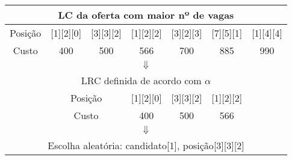\begin{table}[h!]
\centering
\begin{tabular}{ccccccc}
\multicolumn{7}{c}{LC da oferta com maior nº de vagas} \\ \hline
\multicolumn{1}{|c|}{Posição} & \multicolumn{1}{c|}{{[}1{]}{[}2{]}{[}0{]}} & \multicolumn{1}{c|}{{[}3{]}{[}3{]}{[}2{]}} & \multicolumn{1}{c|}{{[}1{]}{[}2{]}{[}2{]}} & \multicolumn{1}{c|}{{[}3{]}{[}2{]}{[}3{]}} & \multicolumn{1}{c|}{{[}7{]}{[}5{]}{[}1{]}} & \multicolumn{1}{c|}{{[}1{]}{[}4{]}{[}4{]}} \\ \hline
\multicolumn{1}{|c|}{Custo} & \multicolumn{1}{c|}{400} & \multicolumn{1}{c|}{500} & \multicolumn{1}{c|}{566} & \multicolumn{1}{c|}{700} & \multicolumn{1}{c|}{885} & \multicolumn{1}{c|}{990} \\ \hline
\multicolumn{7}{c}{\Huge\(\Downarrow\) \vspace{2mm}} \\
\multicolumn{7}{c}{LRC definida de acordo com \(\alpha\)} \\ \cline{2-6}
\multicolumn{1}{c|}{} & \multicolumn{2}{c|}{Posição} & \multicolumn{1}{c|}{{[}1{]}{[}2{]}{[}0{]}} & \multicolumn{1}{c|}{{[}3{]}{[}3{]}{[}2{]}} & \multicolumn{1}{c|}{{[}1{]}{[}2{]}{[}2{]}} &  \\ \cline{2-6}
\multicolumn{1}{c|}{} & \multicolumn{2}{c|}{Custo} & \multicolumn{1}{c|}{400} & \multicolumn{1}{c|}{500} & \multicolumn{1}{c|}{566} &  \\ \cline{2-6}
\multicolumn{7}{c}{\Huge\(\Downarrow\) \vspace{2mm}} \\
\multicolumn{7}{c}{Escolha aleatória: candidato{[}1{]}, posição{[}3{]}{[}3{]}{[}2{]}}
\end{tabular}
\label{tbl_it_constr_sol}
\end{table}

